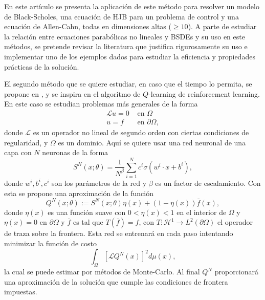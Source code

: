 \documentclass[a4paper,11pt]{scrartcl}
\begin{document}
	En este artículo se presenta la aplicación de este método para resolver un modelo de Black-Scholes, una ecuación de HJB para un problema de control y una ecuación de Allen-Cahn, todas en dimensiones altas ($\geq 10$). A parte de estudiar la relación entre ecuaciones parabólicas no lineales y BSDEs y su uso en este métodos, se pretende revisar la literatura que justifica rigurosamente su uso\cite{Jen1,Beck_2019,Hutzenthaler2020} e implementar uno de los ejemplos dados para estudiar la eficiencia y propiedades prácticas de la solución.
	
	El segundo método que se quiere estudiar, en caso que el tiempo lo permita, se propone en \cite{cohen_neural_2022}, y se inspira en el algoritmo de $Q$-learning de reinforcement learning. En este caso se estudian problemas más generales de la forma
	\begin{equation}
		\begin{aligned}
			\mathcal{L} u=0 & \text { en } \Omega \\
			u=f & \text { en } \partial \Omega,
		\end{aligned}
	\end{equation}
	donde $\mathcal{L}$ es un operador no lineal de segundo orden con ciertas condiciones de regularidad, y $\Omega$ es un dominio.  Aquí se quiere usar una red neuronal de una capa con $N$ neuronas de la forma
	\begin{equation}
		S^N(x ; \theta)=\frac{1}{N^\beta} \sum_{i=1}^N c^i \sigma\left(w^i \cdot x+b^i\right),
	\end{equation}
	donde $w^i,b^i,c^i$ son los parámetros de la red y $\beta$ es un factor de escalamiento. Con esta se propone una aproximación de la función  
	\begin{equation}
		Q^N(x ; \theta):=S^N(x ; \theta) \eta(x)+(1-\eta(x)) \bar{f}(x) ,
	\end{equation}
	donde $\eta(x)$ es una función suave con $0<\eta(x)<1$ en el interior de $\Omega$ y $\eta(x)=0$ en $\partial\Omega$ y $\bar{f}$ es tal que $T(\bar{f})=f$, con $T:\mathcal{H}^1\to L^2(\partial \Omega)$ el operador de traza sobre la frontera. Esta red se entrenará en cada paso intentando minimizar la función de costo 
	\begin{equation}
		\int_{\Omega}\left[\mathcal{L} Q^N(x)\right]^2 d \mu(x),
	\end{equation}
	la cual se puede estimar por métodos de Monte-Carlo. Al final $Q^N$ proporcionará una aproximación de la solución que cumple las condiciones de frontera impuestas.\\
	
\end{document}
